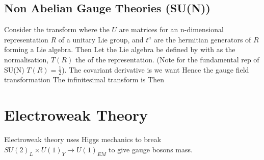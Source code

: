 \documentclass{article}
\begin{document}
\subsection{Non Abelian Gauge Theories (SU(N))}
Consider the transform 
where the $U$ are matrices for an n-dimensional representation $R$ of a unitary Lie group, and $t^a$ are the hermitian generators of $R$ forming a Lie algebra. Then 
Let the Lie algebra be defined by 
with 
as the normalisation, $T(R)$ the  of the representation. (Note for the fundamental rep of SU(N) $T(R)=\frac{1}{2}$). The covariant derivative is 
we want 
Hence the gauge field transformation 
The infinitesimal transform is 
Then 
\section{Electroweak Theory}
Electroweak theory uses Higgs mechanics to break $SU(2)_L \times U(1)_Y \to U(1)_{EM}$ to give gauge bosons mass. 

\end{document}
